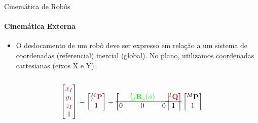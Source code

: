 \documentclass{beamer}
\begin{document}
\begin{frame}{Cinemática de Robôs}
    \framesubtitle{Cinemática Externa}
    \begin{itemize}
        \item O deslocamento de um robô deve ser expresso em relação a um sistema de
        coordenadas (referencial) inercial (global). No plano, utilizamos coordenadas
        cartesianas (eixos X e Y).
    \end{itemize}

    \begin{columns}
        \begin{column}[c]{0.5\textwidth}
            
        \end{column}
        \begin{column}[c]{0.5\textwidth}
            
        \end{column}
    \end{columns}

    \begin{equation*}
        \begin{bmatrix}
            \color{purple}{x_I}\\ \color{purple}{y_I} \\ \color{purple}{z_I}\\1
        \end{bmatrix}
        =
        \begin{bmatrix}
        \color{purple}{{}^M_I\mathbf{P}}\\ 1
        \end{bmatrix}
        =
        \left[
        \begin{matrix}
        & \color{green}{{}_M^I\mathbf{R}_z(\phi)}& \\ \hline
        0 & 0 & 0\\
        \end{matrix} \right.
        \left.
        \vline
        \begin{matrix}
        \color{red}{{}^I\mathbf{Q}}\\ \hline
        1
        \end{matrix} \right]
        \begin{bmatrix}
        {}^M\mathbf{P}\\
        1
        \end{bmatrix}
    \end{equation*}

\end{frame}
\end{document}
